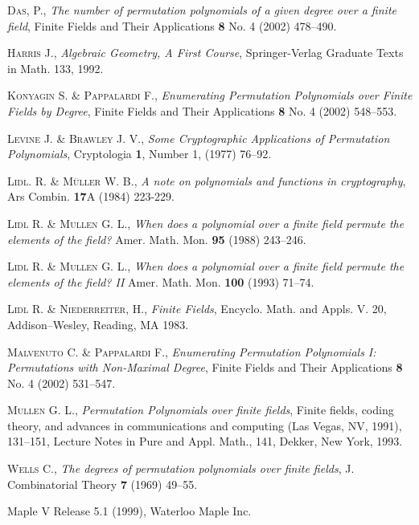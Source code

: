 \documentclass[a4paper,twoside]{article}
\begin{document}
\begin{thebibliography}{99}

 \textsc{Das, P.}, \textit{The number of permutation polynomials
of a given degree over a finite field}, Finite Fields and Their
Applications \textbf{8} No. 4 (2002) 478--490.

 \textsc{Harris J.}, \textit{Algebraic Geometry, A First Course},
Springer-Verlag Graduate Texts in Math. 133, 1992.

 \textsc{Konyagin S. \& Pappalardi F.},
\textit{Enumerating Permutation Polynomials over Finite Fields by
Degree}, Finite Fields and Their Applications \textbf{8} No. 4
(2002) 548--553.

 \textsc{Levine J. \& Brawley J. V.},
\textit{Some Cryptographic Applications of Permutation Polynomials}, Cryptologia
\textbf{1}, Number 1, (1977)  76--92.

 \textsc{Lidl. R. \& M\"uller W. B.}, \textit{A note on polynomials
and functions in cryptography}, Ars Combin. \textbf{17}A (1984) 223-229.

 \textsc{Lidl R. \& Mullen G. L.},
\textit{When does a polynomial over a finite field permute the
elements of the field?} Amer. Math. Mon. \textbf{95} (1988)
243--246.

 \textsc{Lidl R. \& Mullen G. L.},
\textit{When does a polynomial over a finite field permute the
elements of the field? II} Amer. Math. Mon. \textbf{100} (1993)
71--74.

 \textsc{Lidl R. \& Niederreiter, H.}, \textit{Finite Fields},
Encyclo. Math. and Appls. V. 20, Addison--Wesley, Reading, MA 1983.

 \textsc{Malvenuto C. \& Pappalardi F.},
\textit{Enumerating Permutation Polynomials I: Permutations with
Non-Maximal Degree}, Finite Fields and Their Applications
\textbf{8} No. 4 (2002) 531--547.

 \textsc{Mullen G. L.}, \textit{Permutation Polynomials over finite fields},
 Finite fields, coding theory, and advances in communications and computing
 (Las Vegas, NV, 1991), 131--151, Lecture Notes in Pure and Appl. Math., 141, Dekker, New York, 1993.

 \textsc{Wells C.}, \textit{The degrees of permutation polynomials over finite
fields}, J. Combinatorial Theory \textbf{7} (1969) 49--55.

 Maple V Release 5.1 (1999), Waterloo Maple Inc.

\end{thebibliography}
\bigskip
\end{document}
